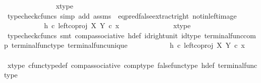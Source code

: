 \begin{isabellebody}
\ \ \ \ \ \ \ \ \ \ \ \ \ \isamarkupfalse%
\ x{\isacharunderscore}{\kern0pt}type\ \isamarkupfalse%
\ {\isacharparenleft}{\kern0pt}typecheck{\isacharunderscore}{\kern0pt}cfuncs{\isacharcomma}{\kern0pt}\ simp\ add{\isacharcolon}{\kern0pt}\ assms\ \ eq{\isacharunderscore}{\kern0pt}pred{\isacharunderscore}{\kern0pt}false{\isacharunderscore}{\kern0pt}extract{\isacharunderscore}{\kern0pt}right\ not{\isacharunderscore}{\kern0pt}in{\isacharunderscore}{\kern0pt}left{\isacharunderscore}{\kern0pt}image{\isacharparenright}{\kern0pt}\isanewline
\ \ \ \ \ \ \isamarkupfalse%
\ \isamarkupfalse%
\ {\isachardoublequoteopen}{\isachardot}{\kern0pt}{\isachardot}{\kern0pt}{\isachardot}{\kern0pt}\ {\isacharequal}{\kern0pt}\ h\ {\isasymcirc}\isactrlsub c\ {\isacharparenleft}{\kern0pt}left{\isacharunderscore}{\kern0pt}coproj\ X\ Y\ {\isasymcirc}\isactrlsub c\ x{\isacharparenright}{\kern0pt}{\isachardoublequoteclose}\isanewline
\ \ \ \ \ \ \ \ \ \ \ \ \ \isamarkupfalse%
\ x{\isacharunderscore}{\kern0pt}type\ \isamarkupfalse%
\ {\isacharparenleft}{\kern0pt}typecheck{\isacharunderscore}{\kern0pt}cfuncs{\isacharcomma}{\kern0pt}\ smt\ comp{\isacharunderscore}{\kern0pt}associative{}\ h{\isacharunderscore}{\kern0pt}def\ id{\isacharunderscore}{\kern0pt}right{\isacharunderscore}{\kern0pt}unit{}\ id{\isacharunderscore}{\kern0pt}type\ terminal{\isacharunderscore}{\kern0pt}func{\isacharunderscore}{\kern0pt}comp\ terminal{\isacharunderscore}{\kern0pt}func{\isacharunderscore}{\kern0pt}type\ terminal{\isacharunderscore}{\kern0pt}func{\isacharunderscore}{\kern0pt}unique{\isacharparenright}{\kern0pt}\isanewline
\ \ \ \ \ \ \isamarkupfalse%
\ \isamarkupfalse%
\ {\isachardoublequoteopen}{\isachardot}{\kern0pt}{\isachardot}{\kern0pt}{\isachardot}{\kern0pt}\ {\isacharequal}{\kern0pt}\ {\isacharparenleft}{\kern0pt}h\ {\isasymcirc}\isactrlsub c\ left{\isacharunderscore}{\kern0pt}coproj\ X\ Y{\isacharparenright}{\kern0pt}\ {\isasymcirc}\isactrlsub c\ x{\isachardoublequoteclose}\isanewline
\ \ \ \ \ \ \ \ \ \ \ \ \ \isamarkupfalse%
\ x{\isacharunderscore}{\kern0pt}type\ cfunc{\isacharunderscore}{\kern0pt}type{\isacharunderscore}{\kern0pt}def\ comp{\isacharunderscore}{\kern0pt}associative\ comp{\isacharunderscore}{\kern0pt}type\ false{\isacharunderscore}{\kern0pt}func{\isacharunderscore}{\kern0pt}type\ h{\isacharunderscore}{\kern0pt}def\ terminal{\isacharunderscore}{\kern0pt}func{\isacharunderscore}{\kern0pt}type\ \isamarkupfalse%

\end{isabellebody}
